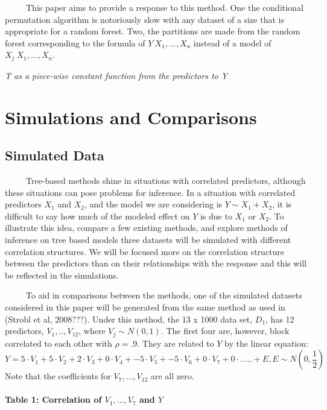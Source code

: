 \documentclass[12pt,twoside]{reedthesis}
\begin{document}
  ~~~~~This paper aims to provide a response to this method. One the
  conditional permutation algorithm is notoriously slow with any dataset
  of a size that is appropriate for a random forest. Two, the partitions
  are made from the random forest corresponding to the formula of
  \(Y~X_1,...,X_n\) instead of a model of \(X_j~X_1,...,X_n\).
  
  \emph{T as a piece-wise constant function from the predictors to Y}
  
  \chapter{Simulations and Comparisons}\label{simulations-and-comparisons}
  
  \section{Simulated Data}\label{simulated-data}
  
  ~~~~~Tree-based methods shine in situations with correlated predictors,
  although these situations can pose problems for inference. In a
  situation with correlated predictors \(X_1\) and \(X_2\), and the model
  we are considering is \(Y \sim X_1 + X_2\), it is difficult to say how
  much of the modeled effect on \(Y\) is due to \(X_1\) or \(X_2\). To
  illustrate this idea, compare a few existing methods, and explore
  methods of inference on tree based models three datasets will be
  simulated with different correlation structures. We will be focused more
  on the correlation structure between the predictors than on their
  relationships with the response and this will be reflected in the
  simulations.
  
  ~~~~~To aid in comparisons between the methods, one of the simulated
  datasets considered in this paper will be generated from the same method
  as used in (Strobl et al, 2008???). Under this method, the 13 x 1000
  data set, \(D_1\), has 12 predictors, \(V_1,..,V_{12}\), where
  \(V_j \sim N(0,1)\). The first four are, however, block correlated to
  each other with \(\rho = .9\). They are related to \(Y\) by the linear
  equation:
  \[Y = 5 \cdot V_1 + 5 \cdot V_2 + 2 \cdot V_3 + 0 \cdot V_4 + -5 \cdot V_5 + -5\cdot V_6 + 0\cdot V_7 + 0 \cdot ..... + E, E \sim N(0,\frac 1 2 )\]
  Note that the coefficients for \(V_7,...,V_{12}\) are all zero.
  
  \subsubsection{\texorpdfstring{Table 1: Correlation of \(V_1,..., V_7\)
  and
  \(Y\)}{Table 1: Correlation of V\_1,..., V\_7 and Y}}\label{table-1-correlation-of-v_1...-v_7-and-y}
  
\end{document}
